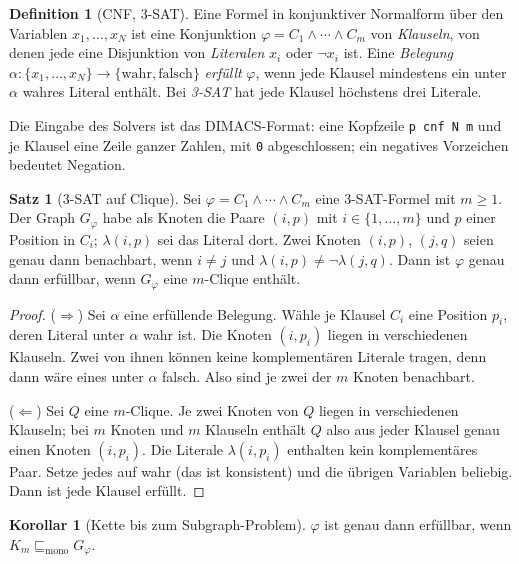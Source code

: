 \documentclass[a4paper,12pt,twoside]{report}
\DeclareRobustCommand{\_}{\textunderscore\allowbreak{}}
\theoremstyle{definition}
\newtheorem{definition}{Definition}[chapter]
\newtheorem{satz}{Satz}[chapter]
\newtheorem{korollar}{Korollar}[chapter]
\begin{document}
\begin{definition}[CNF, 3-SAT]
	Eine Formel in konjunktiver Normalform über den Variablen $x_1,\ldots,x_N$ ist eine Konjunktion $\varphi=C_1\wedge\cdots\wedge C_m$ von \emph{Klauseln}, von denen jede eine Disjunktion von \emph{Literalen} $x_i$ oder $\neg x_i$ ist. Eine \emph{Belegung} $\alpha:\{x_1,\ldots,x_N\}\to\{\mathrm{wahr},\mathrm{falsch}\}$ \emph{erfüllt} $\varphi$, wenn jede Klausel mindestens ein unter $\alpha$ wahres Literal enthält. Bei \emph{3-SAT} hat jede Klausel höchstens drei Literale.
\end{definition}
 
Die Eingabe des Solvers ist das DIMACS-Format: eine Kopfzeile \texttt{p cnf N m} und je Klausel eine Zeile ganzer Zahlen, mit \texttt{0} abgeschlossen; ein negatives Vorzeichen bedeutet Negation.
 
\begin{satz}[3-SAT auf Clique]
	\label{satz:sat_clique}
	Sei $\varphi=C_1\wedge\cdots\wedge C_m$ eine 3-SAT-Formel mit $m\ge 1$. Der Graph $G_\varphi$ habe als Knoten die Paare $(i,p)$ mit $i\in\{1,\ldots,m\}$ und $p$ einer Position in $C_i$; $\lambda(i,p)$ sei das Literal dort. Zwei Knoten $(i,p)$, $(j,q)$ seien genau dann benachbart, wenn $i\neq j$ und $\lambda(i,p)\neq\neg\lambda(j,q)$. Dann ist $\varphi$ genau dann erfüllbar, wenn $G_\varphi$ eine $m$-Clique enthält.
\end{satz}
 
\begin{proof}
	($\Rightarrow$) Sei $\alpha$ eine erfüllende Belegung. Wähle je Klausel $C_i$ eine Position $p_i$, deren Literal unter $\alpha$ wahr ist. Die Knoten $(i,p_i)$ liegen in verschiedenen Klauseln. Zwei von ihnen können keine komplementären Literale tragen, denn dann wäre eines unter $\alpha$ falsch. Also sind je zwei der $m$ Knoten benachbart.
 
	($\Leftarrow$) Sei $Q$ eine $m$-Clique. Je zwei Knoten von $Q$ liegen in verschiedenen Klauseln; bei $m$ Knoten und $m$ Klauseln enthält $Q$ also aus jeder Klausel genau einen Knoten $(i,p_i)$. Die Literale $\lambda(i,p_i)$ enthalten kein komplementäres Paar. Setze jedes auf wahr (das ist konsistent) und die übrigen Variablen beliebig. Dann ist jede Klausel erfüllt.
\end{proof}
 
\begin{korollar}[Kette bis zum Subgraph-Problem]
	\label{kor:kette}
	$\varphi$ ist genau dann erfüllbar, wenn $K_m\sqsubseteq_{\mathrm{mono}}G_\varphi$.
\end{korollar}
 
\end{document}
